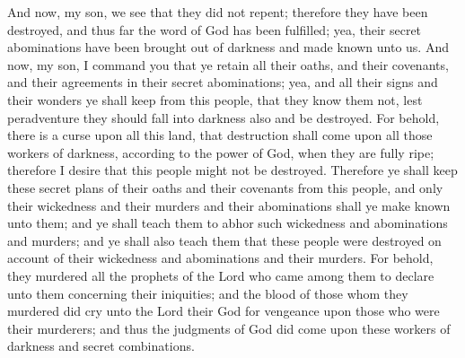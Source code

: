 And now, my son, we see that they did not repent; therefore they have been destroyed, and thus far the word of God has been fulfilled; yea, their secret abominations have been brought out of darkness and made known unto us.
\bverse \iffalse And now, my son, I command you that ye retain all their oaths, and their covenants, and their agreements in their secret abominations; yea, and all their signs and their wonders ye shall keep from this people, that they know them not, lest peradventure they should fall into darkness also and be destroyed. \fi
And now, my son, I command you that ye retain all their oaths, and their covenants, and their agreements in their secret abominations; yea, and all their signs and their wonders ye shall keep from this people, that they know them not, lest peradventure they should fall into darkness also and be destroyed.
\bverse \iffalse For behold, there is a curse upon all this land, that destruction shall come upon all those workers of darkness, according to the power of God, when they are fully ripe; therefore I desire that this people might not be destroyed. \fi
For behold, there is a curse upon all this land, that destruction shall come upon all those workers of darkness, according to the power of God, when they are fully ripe; therefore I desire that this people might not be destroyed.
\bverse \iffalse Therefore ye shall keep these secret plans of their oaths and their covenants from this people, and only their wickedness and their murders and their abominations shall ye make known unto them; and ye shall teach them to abhor such wickedness and abominations and murders; and ye shall also teach them that these people were destroyed on account of their wickedness and abominations and their murders. \fi
Therefore ye shall keep these secret plans of their oaths and their covenants from this people, and only their wickedness and their murders and their abominations shall ye make known unto them; and ye shall teach them to abhor such wickedness and abominations and murders; and ye shall also teach them that these people were destroyed on account of their wickedness and abominations and their murders.
\bverse \iffalse For behold, they murdered all the prophets of the Lord who came among them to declare unto them concerning their iniquities; and the blood of those whom they murdered did cry unto the Lord their God for vengeance upon those who were their murderers; and thus the judgments of God did come upon these workers of darkness and secret combinations. \fi
For behold, they murdered all the prophets of the Lord who came among them to declare unto them concerning their iniquities; and the blood of those whom they murdered did cry unto the Lord their God for vengeance upon those who were their murderers; and thus the judgments of God did come upon these workers of darkness and secret combinations.
